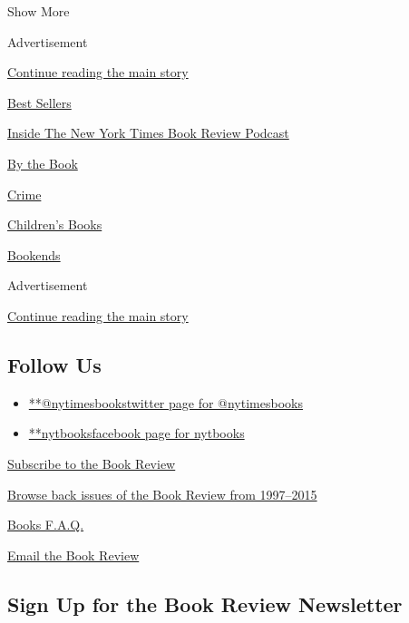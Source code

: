 Show More

Advertisement

\protect\hyperlink{after-mid2}{Continue reading the main story}

\href{https://www.nytimes.com/best-sellers-books/overview.html}{Best
Sellers}

\href{https://www.nytimes.com/column/book-review-podcast}{Inside The New
York Times Book Review Podcast}

\href{https://www.nytimes.com/column/by-the-book}{By the Book}

\href{https://www.nytimes.com/column/crime}{Crime}

\href{https://www.nytimes.com/column/childrens-books}{Children's Books}

\href{https://www.nytimes.com/column/bookends}{Bookends}

Advertisement

\protect\hyperlink{after-mktg}{Continue reading the main story}

\hypertarget{follow-us}{%
\subsection{Follow Us}\label{follow-us}}

\begin{itemize}
\tightlist
\item
  \href{https://twitter.com/nytimesbooks}{**@nytimesbookstwitter page
  for @nytimesbooks}
\item
  \href{https://www.facebook.com/nytbooks}{**nytbooksfacebook page for
  nytbooks}
\end{itemize}

\href{https://homedelivery.nytimes.com/HDS/BookReviewHome.do?mode=BookReviewHome\&ref=review}{Subscribe
to the Book Review}

\href{https://www.nytimes.com/2014/07/29/books/review/the-new-york-times-book-review-back-issues.html}{Browse
back issues of the Book Review from 1997--2015}

\href{https://www.nytimes.com/membercenter/faq/books.html?ref=review}{Books
F.A.Q.}

\href{mailto:books@nytimes.com}{Email the Book Review}

\hypertarget{sign-up-for-the-book-review-newsletter}{%
\subsection{Sign Up for the Book Review
Newsletter}\label{sign-up-for-the-book-review-newsletter}}

